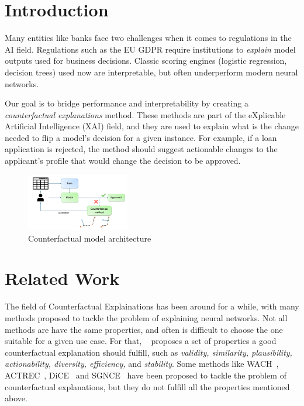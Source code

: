 \documentclass[12pt]{extarticle}
\numberwithin{equation}{section}
\begin{document}
\newpage
\tableofcontents
\thispagestyle{fancy}


\newpage

\section*{Introduction}
Many entities like banks face two challenges when it comes to regulations in the AI field. Regulations such as the EU GDPR require institutions to \emph{explain} model outputs used for business decisions. Classic scoring engines (logistic regression, decision trees) used now are interpretable, but often underperform modern neural networks.

Our goal is to bridge performance and interpretability by creating a \emph{counterfactual explanations} method. These methods are part of the eXplicable Artificial Intelligence (XAI) field, and they are used to explain what is the change needed to flip a model's decision for a given instance. For example, if a loan application is rejected, the method should suggest actionable changes to the applicant's profile that would change the decision to be approved. 
\begin{figure}[H]
    \centering
    \includegraphics[width=0.4\textwidth]{images/diagram}
    \caption{Counterfactual model architecture}
    \label{fig:architecture}
\end{figure}


\section*{Related Work}
The field of Counterfactual Explainations has been around for a while, with many methods proposed to tackle the problem of explaining neural networks. Not all methods are have the same properties, and often is difficult to choose the one suitable for a given use case. For that, ~\cite{guidotti2024counterfactual} proposes a set of properties a good counterfactual explanation should fulfill, such as \emph{validity, similarity, plausibility, actionability, diversity, efficiency,} and \emph{stability}. Some methods like WACH~\cite{wachter2017counterfactual}, ACTREC~\cite{ustun2019actionable}, DiCE~\cite{dice} and SGNCE~\cite{sgnce} have been proposed to tackle the problem of counterfactual explanations, but they do not fulfill all the properties mentioned above. 
\end{document}
